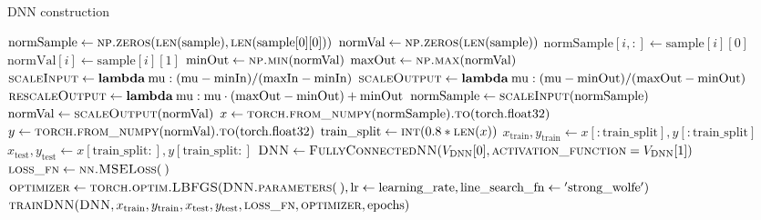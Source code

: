 \begin{algorithm}[H]%
\caption{DNN construction}
\begin{algorithmic}[1]
\State $\mathrm{normSample} \gets \Call{np.zeros}{\protect\Call{len}{\mathrm{sample}}, \protect\Call{len}{\mathrm{sample}[0][0]}}$
\State $\mathrm{normVal} \gets \Call{np.zeros}{\protect\Call{len}{\mathrm{sample}}}$
\State $\mathrm{normSample}[i, :] \gets \mathrm{sample}[i][0]$
\State $\mathrm{normVal}[i] \gets \mathrm{sample}[i][1]$
\EndFor
\State $\mathrm{minOut} \gets \Call{np.min}{\mathrm{normVal}}$
\State $\mathrm{maxOut} \gets \Call{np.max}{\mathrm{normVal}}$
\State $\textproc{scaleInput} \gets \mathbf{lambda}\:\mathrm{mu}: (\mathrm{mu}-\mathrm{minIn})/(\mathrm{maxIn}-\mathrm{minIn})$
\State $\textproc{scaleOutput} \gets \mathbf{lambda}\:\mathrm{mu}: (\mathrm{mu}-\mathrm{minOut})/(\mathrm{maxOut}-\mathrm{minOut})$
\State $\textproc{rescaleOutput} \gets \mathbf{lambda}\:\mathrm{mu}: \mathrm{mu}\cdot(\mathrm{maxOut}-\mathrm{minOut})+\mathrm{minOut}$
\State $\mathrm{normSample} \gets \Call{scaleInput}{\mathrm{normSample}}$
\State $\mathrm{normVal} \gets \Call{scaleOutput}{\mathrm{normVal}}$
\State $x \gets \Call{torch.from\_numpy}{\mathrm{normSample}}\Call{.to}{\mathrm{torch.float32}}$
\State $y \gets \Call{torch.from\_numpy}{\mathrm{normVal}}\Call{.to}{\mathrm{torch.float32}}$
\State $\mathrm{train\_split} \gets \Call{int}{0.8 * \protect\Call{len}{x}}$
\State $x_\mathrm{train}, y_\mathrm{train} \gets x[:\mathrm{train\_split}], y[:\mathrm{train\_split}]$
\State $x_\mathrm{test}, y_\mathrm{test} \gets x[\mathrm{train\_split}:], y[\mathrm{train\_split}:]$
\State $\textproc{DNN} \gets \Call{FullyConnectedNN}{V_\mathrm{DNN}[0], \textproc{activation\_function}=V_\mathrm{DNN}[1]}$
\State $\textproc{loss\_fn} \gets \Call{nn.MSELoss}{\:}$
\State $\textproc{optimizer} \gets \Call{torch.optim.LBFGS}{\protect\Call{DNN.parameters}{\:}, \mathrm{lr}\gets\mathrm{learning\_rate}, \mathrm{line\_search\_fn}\gets\mathrm{'strong\_wolfe'}}$
\State $\Call{trainDNN}{\textproc{DNN}, x_\mathrm{train}, y_\mathrm{train}, x_\mathrm{test}, y_\mathrm{test}, \textproc{loss\_fn}, \textproc{optimizer}, \mathrm{epochs}}$

\end{algorithmic}
\end{algorithm}

